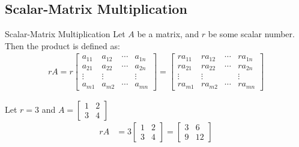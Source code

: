\documentclass[../notes.tex]{subfiles}
\begin{document}
			\subsection{Scalar-Matrix Multiplication}
				\begin{definition}[width=0.7\textwidth]{Scalar-Matrix Multiplication}
					Let $A$ be a matrix, and $r$ be some scalar number.\\
					Then the product  is defined as:
					\begin{align*}
						rA = r \begin{bmatrix}
							a_{11} & a_{12} & \cdots & a_{1n}\\
							a_{21} & a_{22} & \cdots & a_{2n}\\
							\vdots & \vdots & & \vdots\\
							a_{m1} & a_{m2} & \cdots & a_{mn}
						\end{bmatrix}
						= \begin{bmatrix}
							ra_{11} & ra_{12} & \cdots & ra_{1n}\\
							ra_{21} & ra_{22} & \cdots & ra_{2n}\\
							\vdots & \vdots & & \vdots\\
							ra_{m1} & ra_{m2} & \cdots & ra_{mn}
						\end{bmatrix}
					\end{align*}
				\end{definition}
				\begin{example}[width=0.42\textwidth]
					Let $r = 3$ and $A = \begin{bmatrix}
						1 & 2\\
						3 & 4
					\end{bmatrix}$
					\begin{align*}
						rA &= 3\begin{bmatrix}
							1 & 2\\
							3 & 4
						\end{bmatrix}
						= \begin{bmatrix}
							3 & 6\\
							9 & 12
						\end{bmatrix}
					\end{align*}
				\end{example}
\end{document}
